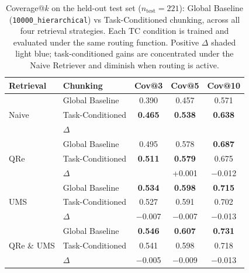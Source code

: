 \begin{table}[htbp]
\centering
\small
\setlength{\tabcolsep}{4pt}
\begin{tabular}{ll ccc}
\toprule
\textbf{Retrieval} & \textbf{Chunking} & \textbf{Cov@3} & \textbf{Cov@5} & \textbf{Cov@10} \\
\midrule
\multirow{3}{*}{Naive}
  & Global Baseline  & 0.390 & 0.457 & 0.571 \\
  & Task-Conditioned & \textbf{0.465} & \textbf{0.538} & \textbf{0.638} \\
  & $\Delta$         & \cellcolor{db1}{+0.075} & \cellcolor{db1}{+0.081} & \cellcolor{db1}{+0.067} \\
\midrule
\multirow{3}{*}{QRe}
  & Global Baseline  & 0.495 & 0.578 & \textbf{0.687} \\
  & Task-Conditioned & \textbf{0.511} & \textbf{0.579} & 0.675 \\
  & $\Delta$         & \cellcolor{db1}{+0.016} & +0.001 & $-$0.012 \\
\midrule
\multirow{3}{*}{UMS}
  & Global Baseline  & \textbf{0.534} & \textbf{0.598} & \textbf{0.715} \\
  & Task-Conditioned & 0.527 & 0.591 & 0.702 \\
  & $\Delta$         & $-$0.007 & $-$0.007 & $-$0.013 \\
\midrule
\multirow{3}{*}{QRe \& UMS}
  & Global Baseline  & \textbf{0.546} & \textbf{0.607} & \textbf{0.731} \\
  & Task-Conditioned & 0.541 & 0.598 & 0.718 \\
  & $\Delta$         & $-$0.005 & $-$0.009 & $-$0.013 \\
\bottomrule
\end{tabular}
\caption{Coverage@$k$ on the held-out test set ($n_{\text{test}}{=}221$):
Global Baseline (\texttt{10000\_hierarchical}) vs Task-Conditioned chunking,
across all four retrieval strategies.
Each TC condition is trained and evaluated under the same routing function.
Positive $\Delta$ shaded light blue; task-conditioned gains are concentrated
under the Naive Retriever and diminish when routing is active.}
\label{tab:tc-inference}
\end{table}


